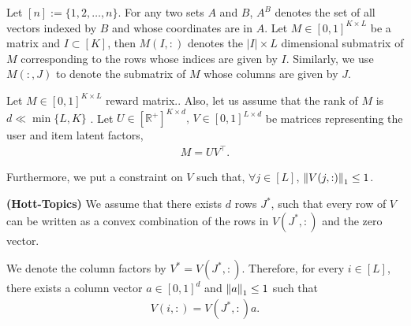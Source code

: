 Let $[n] := \lbrace 1,2,\ldots, n\rbrace$. For any two sets $A$ and $B$, $A^B$ denotes the set of all vectors indexed by $B$ and whose coordinates are in $A$. Let $M\in [0,1]^{K\times L}$ be a matrix and $I \subset [K] $, then $M(I,:)$ denotes the $|I| \times L$ dimensional submatrix of $M$ corresponding to the rows whose indices are given by $I$. Similarly, we use $M(:,J)$ to denote the submatrix of $M$ whose columns are given by $J$.
	
	Let $M \in  [0,1]^{K \times L}$  reward matrix.. Also, let us assume that the rank of  $M$ is $d \ll \min\lbrace L,K\rbrace$ .   Let $ U \in [ \mathbb{R}^+ ]^{K\times d} \textbf{, } V \in  [0,1]^{L\times d}$ be matrices representing the user and item latent factors, 
\begin{align*}
	M = UV^{\intercal} .
\end{align*}	  
	
	Furthermore, we put a constraint on $V$ such that, $\forall j\in [L]$, $ \left\lVert V(j,:)\right\rVert_1 \leq 1$. 
	
	
\begin{assumption}\textbf{(Hott-Topics)}
\label{assm:hott-topics}
We assume that there exists $d$ rows $J^*$,  such that every row of $V$ can be written as a convex combination of the rows in $V(J^*,:)$ and the zero vector. 
\end{assumption}
We denote the column  factors by $V^* = V(J^*,:)$. Therefore, for every $i\in [L]$, there exists a column vector $a \in [0,1]^{d}$ and $ \left\lVert a\right\rVert_1 \leq 1$ such that 
\begin{align*}
V(i,:) = V(J^*,:) a.
\end{align*}




